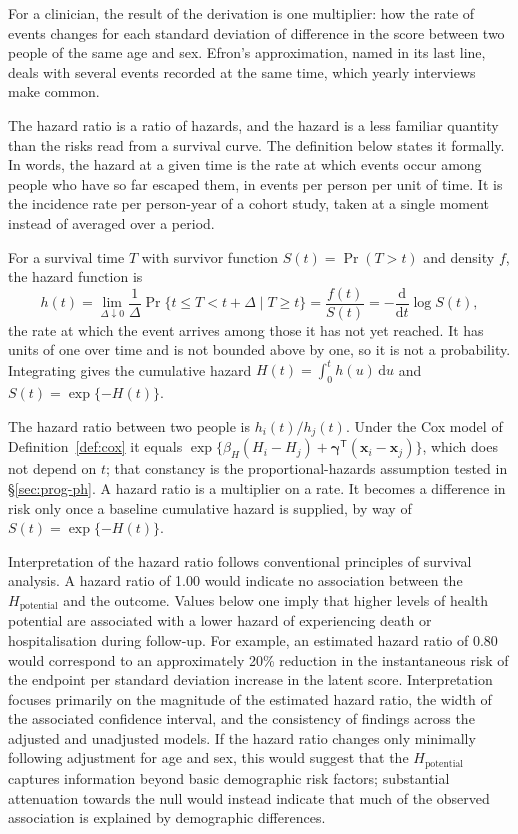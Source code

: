 \noindent For a clinician, the result of the derivation is one multiplier: how the rate of events changes for each standard deviation of difference in the score between two people of the same age and sex. Efron's approximation, named in its last line, deals with several events recorded at the same time, which yearly interviews make common.

The hazard ratio is a ratio of hazards, and the hazard is a less familiar quantity than the risks read from a survival curve. The definition below states it formally. In words, the hazard at a given time is the rate at which events occur among people who have so far escaped them, in events per person per unit of time. It is the incidence rate per person-year of a cohort study, taken at a single moment instead of averaged over a period.

\begin{definition}
\label{def:prog2:hazard}
For a survival time $T$ with survivor function $S(t)=\Pr(T>t)$ and density
$f$, the hazard function is
\begin{equation}
  h(t)=\lim_{\Delta\downarrow0}\frac{1}{\Delta}
       \Pr\{t\le T<t+\Delta\mid T\ge t\}
      =\frac{f(t)}{S(t)}
      =-\frac{\mathrm{d}}{\mathrm{d}t}\log S(t),
  \label{eq:hazard}
\end{equation}
the rate at which the event arrives among those it has not yet reached. It
has units of one over time and is not bounded above by one, so it is not a
probability. Integrating gives the cumulative hazard
$H(t)=\int_0^t h(u)\,\mathrm{d}u$ and $S(t)=\exp\{-H(t)\}$.

The hazard ratio between two people is $h_i(t)/h_j(t)$. Under the Cox model
of Definition~\ref{def:cox} it equals
$\exp\{\beta_H(H_i-H_j)+\boldsymbol\gamma^{\mathsf T}(\mathbf x_i-\mathbf x_j)\}$,
which does not depend on $t$; that constancy is the proportional-hazards
assumption tested in \S\ref{sec:prog-ph}. A hazard ratio is a multiplier on a
rate. It becomes a difference in risk only once a baseline cumulative hazard
is supplied, by way of $S(t)=\exp\{-H(t)\}$.
\end{definition}

Interpretation of the hazard ratio follows conventional principles of survival analysis. A hazard ratio of 1.00 would indicate no association between the $H_{\text{potential}}$ and the outcome. Values below one imply that higher levels of health potential are associated with a lower hazard of experiencing death or hospitalisation during follow-up. For example, an estimated hazard ratio of 0.80 would correspond to an approximately 20\% reduction in the instantaneous risk of the endpoint per standard deviation increase in the latent score. Interpretation focuses primarily on the magnitude of the estimated hazard ratio, the width of the associated confidence interval, and the consistency of findings across the adjusted and unadjusted models. If the hazard ratio changes only minimally following adjustment for age and sex, this would suggest that the $H_{\text{potential}}$ captures information beyond basic demographic risk factors; substantial attenuation towards the null would instead indicate that much of the observed association is explained by demographic differences.

